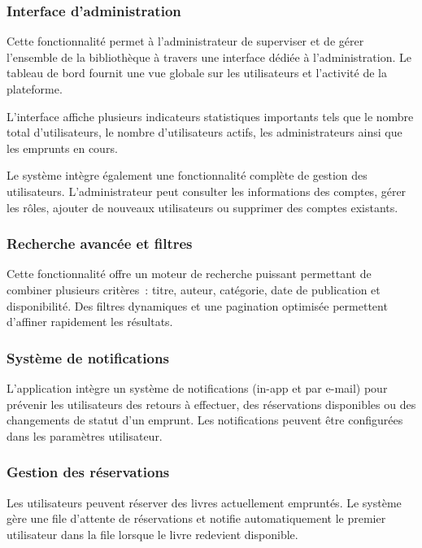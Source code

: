 \documentclass{rapportPFA}
\begin{document}
\subsubsection{Interface d'administration}
\begin{figure}[h]
    \centering
    
\end{figure}
Cette fonctionnalité permet à l'administrateur de superviser et de gérer l'ensemble de la bibliothèque à travers une interface dédiée à l'administration. Le tableau de bord fournit une vue globale sur les utilisateurs et l'activité de la plateforme.

L'interface affiche plusieurs indicateurs statistiques importants tels que le nombre total d'utilisateurs, le nombre d'utilisateurs actifs, les administrateurs ainsi que les emprunts en cours.

Le système intègre également une fonctionnalité complète de gestion des utilisateurs. L'administrateur peut consulter les informations des comptes, gérer les rôles, ajouter de nouveaux utilisateurs ou supprimer des comptes existants.

\subsubsection{Recherche avancée et filtres}
Cette fonctionnalité offre un moteur de recherche puissant permettant de combiner plusieurs critères~: titre, auteur, catégorie, date de publication et disponibilité. Des filtres dynamiques et une pagination optimisée permettent d'affiner rapidement les résultats.

\subsubsection{Système de notifications}
L'application intègre un système de notifications (in-app et par e-mail) pour prévenir les utilisateurs des retours à effectuer, des réservations disponibles ou des changements de statut d'un emprunt. Les notifications peuvent être configurées dans les paramètres utilisateur.

\subsubsection{Gestion des réservations}
Les utilisateurs peuvent réserver des livres actuellement empruntés. Le système gère une file d'attente de réservations et notifie automatiquement le premier utilisateur dans la file lorsque le livre redevient disponible.
\end{document}
